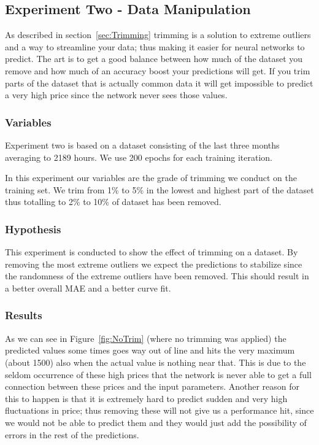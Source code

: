 \newpage
\subsection{Experiment Two - Data Manipulation}
\label{sec:priceExperimentTwo}
As described in section~\ref{sec:Trimming} trimming is a solution to extreme outliers and a way to streamline your data; thus making it easier for neural networks to predict. The art is to get a good balance between how much of the dataset you remove and how much of an accuracy boost your predictions will get. If you trim parts of the dataset that is actually common data it will get impossible to predict a very high price since the network never sees those values.

\subsubsection{Variables}
Experiment two is based on a dataset consisting of the last three months averaging to 2189 hours. We use 200 epochs for each training iteration.

In this experiment our variables are the grade of trimming we conduct on the training set. We trim from 1\% to 5\% in the lowest and highest part of the dataset thus totalling to 2\% to 10\% of dataset has been removed.

\subsubsection{Hypothesis}
This experiment is conducted to show the effect of trimming on a dataset. By removing the most extreme outliers we expect the predictions to stabilize since the randomness of the extreme outliers have been removed. This should result in a better overall MAE and a better curve fit.

\subsubsection{Results}
As we can see in Figure~\ref{fig:NoTrim} (where no trimming was applied) the predicted values some times goes way out of line and hits the very maximum (about 1500) also when the actual value is nothing near that. This is due to the seldom occurrence of these high prices that the network is never able to get a full connection between these prices and the input parameters. Another reason for this to happen is that it is extremely hard to predict sudden and very high fluctuations in price; thus removing these will not give us a performance hit, since we would not be able to predict them and they would just add the possibility of errors in the rest of the predictions.

